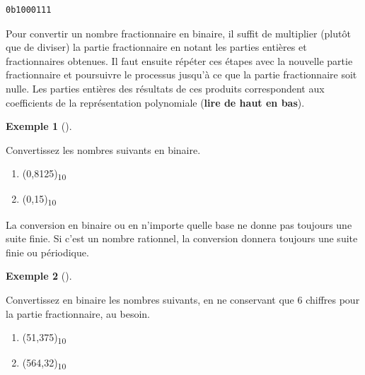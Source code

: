 \documentclass[
  letterpaper,
]{scrbook}
\providecommand{\tightlist}{%
  \setlength{\itemsep}{0pt}\setlength{\parskip}{0pt}}\usepackage{longtable,booktabs,array}
\theoremstyle{plain}
\theoremstyle{definition}
\newtheorem{example}{Exemple}[chapter]
\theoremstyle{definition}
\theoremstyle{remark}
\begin{document}
\begin{verbatim}
0b1000111
\end{verbatim}

Pour convertir un nombre fractionnaire en binaire, il suffit de
multiplier (plutôt que de diviser) la partie fractionnaire en notant les
parties entières et fractionnaires obtenues. Il faut ensuite répéter ces
étapes avec la nouvelle partie fractionnaire et poursuivre le processus
jusqu'à ce que la partie fractionnaire soit nulle. Les parties entières
des résultats de ces produits correspondent aux coefficients de la
représentation polynomiale (\textbf{lire de haut en bas}).

\leavevmode{}%
\begin{example}[]\label{exm-conversion-fractionnaire-binaire}

Convertissez les nombres suivants en binaire.

\begin{enumerate}
\def\labelenumi{\alph{enumi})}
\tightlist
\item
  (0,8125)\textsubscript{10}
\item
  (0,15)\textsubscript{10}
\end{enumerate}

\end{example}

\begin{tcolorbox}[enhanced jigsaw, opacityback=0, rightrule=.15mm, breakable, toprule=.15mm, colbacktitle=quarto-callout-important-color!10!white, title=\textcolor{quarto-callout-important-color}{\faExclamation}\hspace{0.5em}{Important}, titlerule=0mm, arc=.35mm, colback=white, coltitle=black, colframe=quarto-callout-important-color-frame, bottomtitle=1mm, toptitle=1mm, bottomrule=.15mm, leftrule=.75mm, left=2mm, opacitybacktitle=0.6]

La conversion en binaire ou en n'importe quelle base ne donne pas
toujours une suite finie. Si c'est un nombre rationnel, la conversion
donnera toujours une suite finie ou périodique.

\end{tcolorbox}

\leavevmode{}%
\begin{example}[]\label{exm-conversion-binaire-totale}

Convertissez en binaire les nombres suivants, en ne conservant que 6
chiffres pour la partie fractionnaire, au besoin.

\begin{enumerate}
\def\labelenumi{\alph{enumi})}
\tightlist
\item
  (51,375)\textsubscript{10}
\item
  (564,32)\textsubscript{10}
\end{enumerate}

\end{example}
\end{document}
